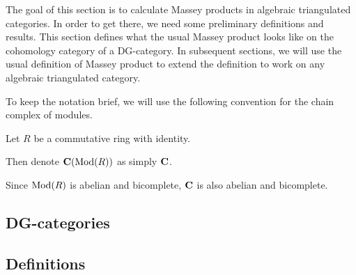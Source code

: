 The goal of this section is to calculate Massey products in algebraic triangulated categories. In order to get there, we need some preliminary definitions and results. This section defines what the usual Massey product looks like on the cohomology category of a DG-category. In subsequent sections, we will use the usual definition of Massey product to extend the definition to work on any algebraic triangulated category.

To keep the notation brief, we will use the following convention for the chain complex of modules.
\begin{notation}
    Let \( R \) be a commutative ring with identity.

    Then denote \( \operatorname{\mathbf{C}}(\operatorname{Mod}(R)) \) as simply \( \operatorname{\mathbf{C}} \).
\end{notation}

Since \( \operatorname{Mod}(R) \) is abelian and bicomplete, \( \operatorname{\mathbf{C}} \) is also abelian and bicomplete.

\subsection{DG-categories}


\subsection{Definitions}

